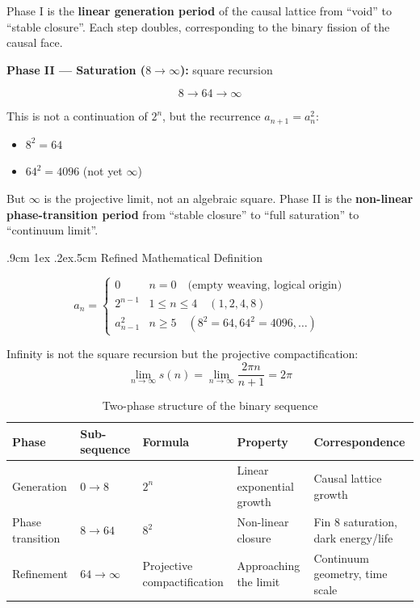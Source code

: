 \documentclass[aps,prd,twocolumn,nofootinbib,floatfix]{revtex4-2}
\makeatletter
\def\subsection{%
  \@startsection{subsection}{2}{\z@}
    {.9cm \@plus1ex \@minus .2ex}{.5cm}
    {\normalfont\normalsize\bfseries\centering}%
}
\makeatother
\begin{document}
Phase I is the \textbf{linear generation period} of the causal lattice from ``void'' to ``stable closure''. Each step doubles, corresponding to the binary fission of the causal face.

\textbf{Phase II --- Saturation ($8 \to \infty$):} square recursion

\[
8 \to 64 \to \infty
\]

This is not a continuation of $2^n$, but the recurrence $a_{n+1} = a_n^2$:
\begin{itemize}
    \item $8^2 = 64$
    \item $64^2 = 4096$ (not yet $\infty$)
\end{itemize}

But $\infty$ is the projective limit, not an algebraic square. Phase II is the \textbf{non-linear phase-transition period} from ``stable closure'' to ``full saturation'' to ``continuum limit''.

\subsection{Refined Mathematical Definition}

\[
\boxed{
a_n =
\begin{cases}
0 & n = 0 \quad \text{(empty weaving, logical origin)} \\
2^{n-1} & 1 \le n \le 4 \quad (1, 2, 4, 8) \\
a_{n-1}^2 & n \ge 5 \quad (8^2 = 64, 64^2 = 4096, \dots)
\end{cases}
}
\]

Infinity is not the square recursion but the projective compactification:
\[
\lim_{n\to\infty} s(n) = \lim_{n\to\infty} \frac{2\pi n}{n+1} = 2\pi
\]

\begin{table}[!t]
\centering
\begin{tabular}{|l|l|l|l|l|}
\hline
Phase & Sub-sequence & Formula & Property & Correspondence \\
\hline
Generation & $0 \to 8$ & $2^n$ & Linear exponential growth & Causal lattice growth \\
Phase transition & $8 \to 64$ & $8^2$ & Non-linear closure & Fin 8 saturation, dark energy/life \\
Refinement & $64 \to \infty$ & Projective compactification & Approaching the limit & Continuum geometry, time scale \\
\hline
\end{tabular}
\caption{Two-phase structure of the binary sequence}
\end{table}
\end{document}
